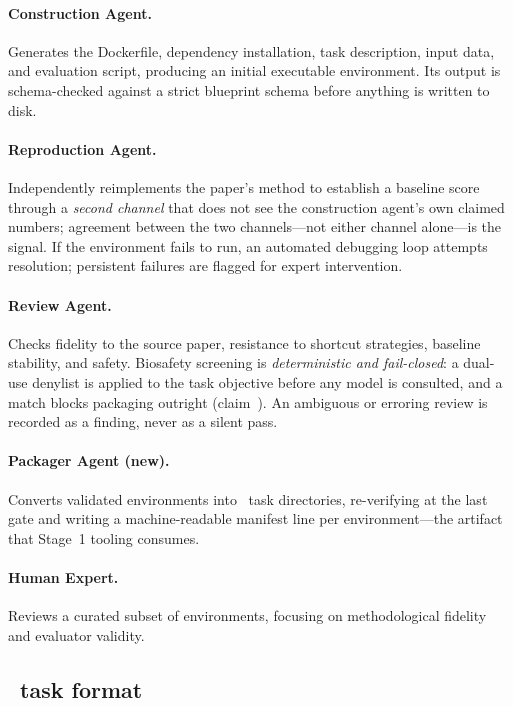 \paragraph{Construction Agent.}
Generates the Dockerfile, dependency installation, task description, input data,
and evaluation script, producing an initial executable environment. Its output is
schema-checked against a strict blueprint schema before anything is written to
disk.

\paragraph{Reproduction Agent.}
Independently reimplements the paper's method to establish a baseline score
through a \emph{second channel} that does not see the construction agent's own
claimed numbers; agreement between the two channels---not either channel
alone---is the signal. If the environment fails to run, an automated debugging
loop attempts resolution; persistent failures are flagged for expert
intervention.

\paragraph{Review Agent.}
Checks fidelity to the source paper, resistance to shortcut strategies, baseline
stability, and safety. Biosafety screening is \emph{deterministic and
fail-closed}: a dual-use denylist is applied to the task objective before any
model is consulted, and a match blocks packaging outright (claim~). An
ambiguous or erroring review is recorded as a finding, never as a silent pass.

\paragraph{Packager Agent (new).}
Converts validated environments into \harbor\ task directories, re-verifying at
the last gate and writing a machine-readable manifest line per environment---the
artifact that Stage~1 tooling consumes.

\paragraph{Human Expert.}
Reviews a curated subset of environments, focusing on methodological fidelity
and evaluator validity.

\subsection{\harbor\ task format}
\label{sec:format}

